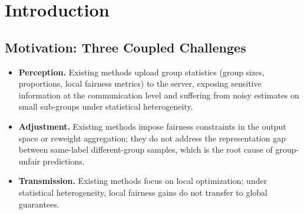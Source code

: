 \documentclass{article}
\begin{document}
\section{Introduction}
\subsection{Motivation: Three Coupled Challenges}
\begin{itemize}
  \item \textbf{Perception.} Existing methods upload group statistics
        (group sizes, proportions, local fairness metrics) to the server,
        exposing sensitive information at the communication level and
        suffering from noisy estimates on small sub-groups under statistical
        heterogeneity.
  \item \textbf{Adjustment.} Existing methods impose fairness constraints in
        the output space or reweight aggregation; they do not address the
        representation gap between same-label different-group samples, which
        is the root cause of group-unfair predictions.
  \item \textbf{Transmission.} Existing methods focus on local optimization;
        under statistical heterogeneity, local fairness gains do not
        transfer to global guarantees.
\end{itemize}
\end{document}
